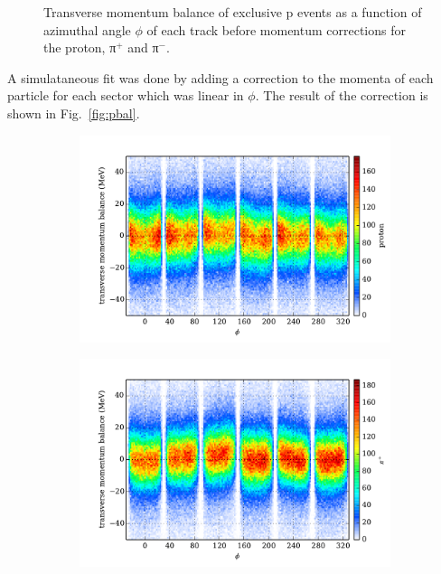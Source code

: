 \begin{figure}
\begin{center}
\begin{subfigure}{0.4\columnwidth}
\end{subfigure}
\caption[Momentum Balance Before Corrections]{\label{fig:pbal.before}Transverse momentum balance of exclusive p \π[+] \π[-] events as a function of azimuthal angle $\phi$ of each track before momentum corrections for the proton, π$^+$ and π$^-$.}
\end{center}\end{figure}

A simulataneous fit was done by adding a correction to the momenta of each particle for each sector which was linear in $\phi$. The result of the correction is shown in Fig.~\ref{fig:pbal}.

\begin{figure}\begin{center}
\begin{subfigure}{0.4\columnwidth}
    \includegraphics[width=\columnwidth]{figures/pcor/pcor_mptbal_fixed_p.pdf}
\end{subfigure}
\begin{subfigure}{0.4\columnwidth}
    \includegraphics[width=\columnwidth]{figures/pcor/pcor_mptbal_fixed_pip.pdf}

\end{subfigure}
\end{center}
\end{figure}
